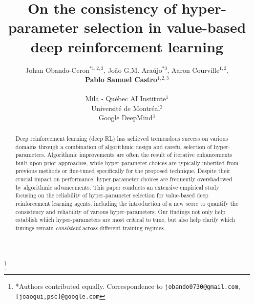 \documentclass[10pt]{article} %
\title{On the consistency of hyper-parameter selection in value-based deep reinforcement learning}
\author{Johan Obando-Ceron\(^{*1,2,3}\), João G.M. Araújo\(^{*3}\), Aaron Courville\(^{1,2}\), \\\textbf{Pablo Samuel Castro\(^{1,2,3}\)
}\\\\
Mila - Québec AI Institute\(^{1}\) \\
Universit\'e de Montr\'eal\(^{2}\) \\
Google DeepMind\(^{3}\)  \\
}
\newcommand\blfootnote[1]{%
  \begingroup
  \renewcommand\thefootnote{}\footnote{#1}%
  \addtocounter{footnote}{-1}%
  \endgroup
}
\begin{document}
\maketitle
\blfootnote{*Authors contributed equally. Correspondence to \texttt{jobando0730@gmail.com},\texttt{[joaogui,psc]@google.com}}

\begin{abstract}
Deep reinforcement learning (deep RL) has achieved tremendous success on various domains through a combination of algorithmic design and careful selection of hyper-parameters. Algorithmic improvements are often the result of iterative enhancements built upon prior approaches, while hyper-parameter choices are typically inherited from previous methods or fine-tuned specifically for the proposed technique. Despite their crucial impact on performance, hyper-parameter choices are frequently overshadowed by algorithmic advancements. This paper conducts an extensive empirical study focusing on the reliability of hyper-parameter selection for value-based deep reinforcement learning agents, including the introduction of a new score to quantify the consistency and reliability of various hyper-parameters. Our findings not only help establish which hyper-parameters are most critical to tune, but also help clarify which tunings remain {\em consistent} across different training regimes.

\end{abstract}





%






\newpage
\appendix

\end{document}
